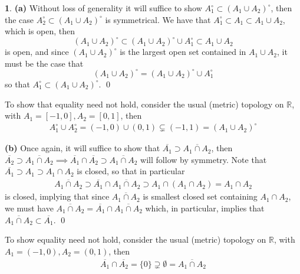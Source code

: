 \documentclass[10.5pt]{article}
\theoremstyle{definition}
\newtheorem{pb}{}
\newcommand{\set}[1]{\{#1\}}
\begin{document}
    \begin{pb}
        \textbf{(a)} Without loss of generality it will suffice to show \(A_1^\circ \subset (A_1 \cup A_2)^\circ\), then the case \(A_2^\circ \subset (A_1 \cup A_2)^\circ\) is symmetrical. We have that \(A_1^\circ \subset A_1 \subset A_1 \cup A_2\), which is open, then
        \[(A_1 \cup A_2)^\circ \subset (A_1 \cup A_2)^\circ \cup A_1^\circ \subset A_1 \cup A_2\]
        is open, and since  \((A_1 \cup A_2)^\circ\) is the largest open set contained in \(A_1 \cup A_2\), it must be the case that
        \[(A_1 \cup A_2)^\circ = (A_1 \cup A_2)^\circ \cup A_1^\circ\]
        so that \(A_1^\circ \subset (A_1 \cup A_2)^\circ\). \qed
        
        To show that equality need not hold, consider the usual (metric) topology on \(\mathbb{R}\), with \(A_1 = [-1,0], A_2 = [0,1]\), then
        \begin{align*}
            A_1^\circ \cup A_2^\circ = (-1,0) \cup (0,1) \subsetneq (-1,1) = (A_1 \cup A_2)^\circ
        \end{align*}

        \textbf{(b)} Once again, it will suffice to show that \(\overline{A_1} \supset \overline{A_1 \cap A_2}\), then \(\overline{A_2} \supset \overline{A_1 \cap A_2} \implies \overline{A_1} \cap \overline{A_2} \supset \overline{A_1 \cap A_2}\) will follow by symmetry. Note that \(\overline{A_1} \supset A_1 \supset A_1\cap A_2\) is closed, so that in particular
        \begin{align*}
            \overline{A_1 \cap A_2} \supset \overline{A_1} \cap \overline{A_1 \cap A_2} \supset A_1 \cap (A_1 \cap A_2) = A_1 \cap A_2
        \end{align*}
        is closed, implying that since \(\overline{A_1 \cap A_2}\) is smallest closed set containing \(A_1 \cap A_2\), we must have \(\overline{A_1 \cap A_2} = \overline{A_1} \cap \overline{A_1 \cap A_2}\) which, in particular, implies that \(\overline{A_1 \cap A_2} \subset \overline{A_1}\). \qed

        To show equality need not hold, consider the usual (metric) topology on \(\mathbb{R}\), with \(A_1 = (-1,0), A_2 = (0,1)\), then
        \begin{align*}
            \overline{A_1}\cap \overline{A_2} = \set{0} \supsetneq \emptyset = \overline{A_1 \cap A_2}
        \end{align*}
    \end{pb}
\end{document}
